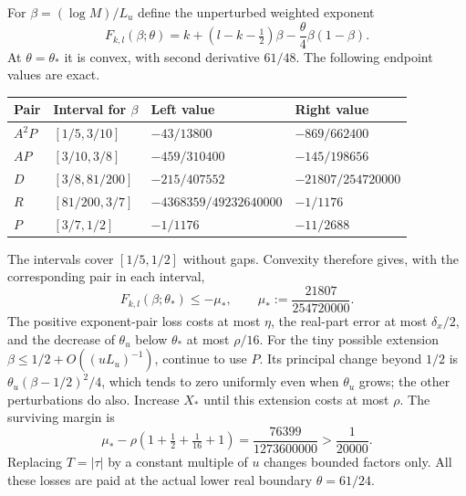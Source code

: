 \documentclass[11pt]{article}
\numberwithin{equation}{section}
\theoremstyle{definition}
\theoremstyle{remark}
\begin{document}
For $\beta=(\log M)/L_u$ define the unperturbed weighted exponent
\begin{equation}
 F_{k,l}(\beta;\theta)
 =k+(l-k-\tfrac12)\beta-\frac{\theta}{4}\beta(1-\beta).
 \label{eq:closed-weighted-exponent}
\end{equation}
At $\theta=\theta_*$ it is convex, with second derivative $61/48$.
The following endpoint values are exact.
\begin{center}
\small
\begin{tabular}{@{}llll@{}}
\toprule
Pair & Interval for $\beta$ & Left value & Right value\\
\midrule
$A^2P$ & $[1/5,3/10]$ & $-43/13800$ & $-869/662400$\\
$AP$ & $[3/10,3/8]$ & $-459/310400$ & $-145/198656$\\
$D$ & $[3/8,81/200]$ & $-215/407552$ & $-21807/254720000$\\
$R$ & $[81/200,3/7]$ & $-4368359/49232640000$ & $-1/1176$\\
$P$ & $[3/7,1/2]$ & $-1/1176$ & $-11/2688$\\
\bottomrule
\end{tabular}
\end{center}
The intervals cover $[1/5,1/2]$ without gaps. Convexity therefore gives,
with the corresponding pair in each interval,
\begin{equation}
 F_{k,l}(\beta;\theta_*)\le-\mu_*,\qquad
 \mu_*:=\frac{21807}{254720000}.
 \label{eq:closed-margin}
\end{equation}
The positive exponent-pair loss costs at most $\eta$, the real-part
error at most $\delta_x/2$, and the decrease of $\theta_u$ below
$\theta_*$ at most $\rho/16$. For the tiny possible extension
$\beta\le1/2+O((uL_u)^{-1})$, continue to use $P$. Its principal change
beyond $1/2$ is $\theta_u(\beta-1/2)^2/4$, which tends to zero uniformly
even when $\theta_u$ grows; the other perturbations do also. Increase
$X_*$ until this extension costs at most $\rho$. The surviving margin is
\begin{equation}
 \mu_*-\rho(1+\tfrac12+\tfrac1{16}+1)
 =\frac{76399}{1273600000}>\frac1{20000}.
 \label{eq:closed-paid-margin}
\end{equation}
Replacing $T=|\tau|$ by a constant multiple of $u$ changes bounded
factors only. All these losses are paid at the actual lower real
boundary $\theta=61/24$.
\end{document}

